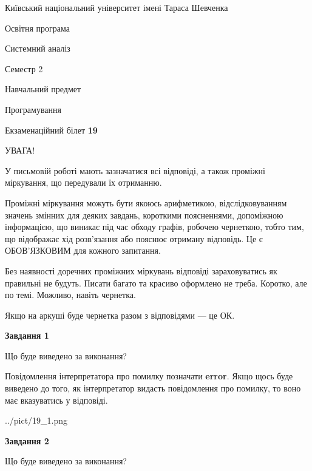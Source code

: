 \documentclass[12pt, ukrainian]{article}
\begin{document}
{{\begin {small}\par
{ \center  Київський національний університет імені Тараса Шевченка \par}
{\parbox {5 cm}{Освітня програма \hfill}{\parbox {7 cm}{Системний аналіз \hfill}}\parbox {6 cm}{\hfill Семестр 2}}\par
{\parbox {5 cm} {Навчальний предмет \hfill}\parbox {7 cm}{Програмування \hfill}\parbox {6cm}{\hfill}\par}\vspace{-7pt} \end{small}}{\center Екзаменаційний білет \No \textbf
{ 19 }\par}}
{
\begin {large}
УВАГА!

У письмовій роботі мають зазначатися всі відповіді, а також проміжні міркування, що передували їх отриманню.

Проміжні міркування можуть бути якоюсь арифметикою, відслідковуванням зна\-чень змінних для деяких завдань,
короткими поясненнями, допоміжною інформацією, що виникає під час обходу графів, робочею чернеткою,
тобто тим, що відображає хід розв’язання або пояснює отриману відповідь.
Це є ОБОВ’ЯЗКОВИМ для кожного запитання.

Без наявності доречних проміжних міркувань відповіді зараховуватись як правиль\-ні не будуть.
Писати багато та красиво оформлено не треба. Коротко, але по темі. Можли\-во, навіть чернетка.

Якщо на аркуші буде чернетка разом з відповідями --- це ОК.

\newpage

{\begin {center}\textbf{Завдання 1}\end {center}}\par
Що буде виведено за виконання?

Повідомлення інтерпретатора про помилку позначати \textbf{error}.
Якщо щось буде виведено до того, як інтерпретатор видасть повідомлення про помилку, 
то воно має вказуватись у відповіді. \par


\begin{center}
	{../pict/19_1.png}
\end{center}
\newpage

{\begin {center}\textbf{Завдання 2}\end {center}}\par
Що буде виведено за виконання?


\end{large}}
\end{document}
